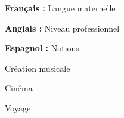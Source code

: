 \documentclass[a4paper,11pt]{article}
\begin{document}
\begin{cv}[profile][1.9]
\begin{cvitem}
    \textbf{Français :} Langue maternelle
\end{cvitem}

\cvseparator
\begin{cvitem}
    \textbf{Anglais :} Niveau professionnel
\end{cvitem}

\cvseparator
\begin{cvitem}
    \textbf{Espagnol :} Notions
\end{cvitem}

\begin{cvitem}
    Création musicale
\end{cvitem}

\cvseparator
\begin{cvitem}
    Cinéma
\end{cvitem}

\cvseparator
\begin{cvitem}
    Voyage
\end{cvitem}

\end{cv}
\end{document}
